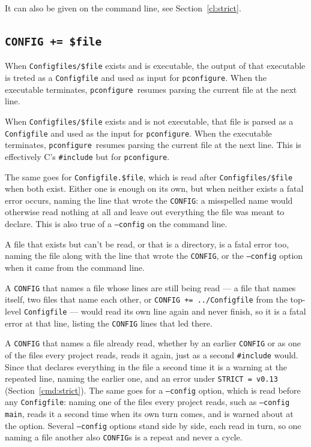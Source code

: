 \documentclass{article}
\newcommand{\pconfigure}{\texttt{pconfigure}}
\begin{document}
It can also be given on the command line, see
Section~\ref{cl:strict}.

\subsection{\texttt{CONFIG += \$file} \label{cmd:config}}

When \texttt{Configfiles/\$file} exists and is executable, the output
of that executable is treted as a \texttt{Configfile} and used as
input for \pconfigure.  When the executable terminates,
\pconfigure\ resumes parsing the current file at the next line.

When \texttt{Configfiles/\$file} exists and is not executable, that
file is parsed as a \texttt{Configfile} and used as the input for
\pconfigure.  When the executable terminates, \pconfigure\ resumes
parsing the current file at the next line.  This is effectively C's
\texttt{\#include} but for \pconfigure.

The same goes for \texttt{Configfile.\$file}, which is read after
\texttt{Configfiles/\$file} when both exist.  Either one is enough on
its own, but when neither exists a fatal error occurs, naming the line
that wrote the \texttt{CONFIG}: a misspelled name would otherwise read
nothing at all and leave out everything the file was meant to declare.
This is also true of a \texttt{--config} on the command line.

A file that exists but can't be read, or that is a directory, is a
fatal error too, naming the file along with the line that wrote the
\texttt{CONFIG}, or the \texttt{--config} option when it came from the
command line.

A \texttt{CONFIG} that names a file whose lines are still being read
--- a file that names itself, two files that name each other, or
\texttt{CONFIG += ../Configfile} from the top-level \texttt{Configfile}
--- would read its own line again and never finish, so it is a fatal
error at that line, listing the \texttt{CONFIG} lines that led there.

A \texttt{CONFIG} that names a file already read, whether by an earlier
\texttt{CONFIG} or as one of the files every project reads, reads it
again, just as a second \texttt{\#include} would.  Since that declares
everything in the file a second time it is a warning at the repeated
line, naming the earlier one, and an error under \texttt{STRICT = v0.13}
(Section~\ref{cmd:strict}).  The same goes for a \texttt{--config}
option, which is read before any \texttt{Configfile}: naming one of
the files every project reads, such as \texttt{--config main}, reads
it a second time when its own turn comes, and is warned about at the
option.  Several \texttt{--config} options stand side by side, each
read in turn, so one naming a file another also \texttt{CONFIG}s is a
repeat and never a cycle.
\end{document}
